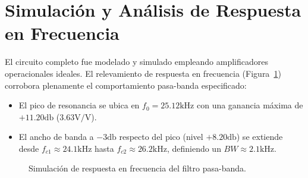 \section{Simulación y Análisis de Respuesta en Frecuencia}
El circuito completo fue modelado y simulado empleando amplificadores operacionales ideales. El relevamiento de
respuesta en frecuencia (Figura~\ref{fig.ej4:bode_ac}) corrobora plenamente el comportamiento pasa-banda especificado:
\begin{itemize}
    \item El pico de resonancia se ubica en $f_0 = 25.12 \unit{\kilo\hertz}$ con una ganancia máxima de $+11.20
        \unit{\decibel}$ ($3.63 \unit{\volt\per\volt}$).
    \item El ancho de banda a $-3 \unit{\decibel}$ respecto del pico (nivel $+8.20 \unit{\decibel}$) se extiende desde
        $f_{c1} \approx 24.1 \unit{\kilo\hertz}$ hasta $f_{c2} \approx 26.2 \unit{\kilo\hertz}$, definiendo un $BW
        \approx 2.1 \unit{\kilo\hertz}$.
\end{itemize}
\begin{figure}[!ht]
    \centering
    
    \caption{Simulación de respuesta en frecuencia del filtro pasa-banda.}
    \label{fig.ej4:bode_ac}
\end{figure}
